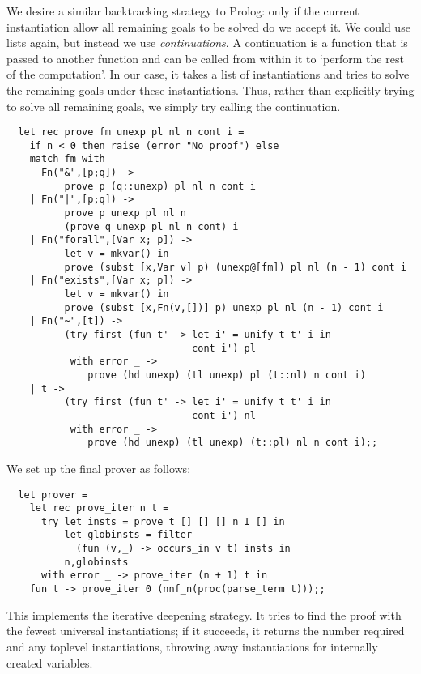 We desire a similar backtracking strategy to Prolog: only if the current
instantiation allow all remaining goals to be solved do we accept it. We could
use lists again, but instead we use {\em continuations}. A continuation is a
function that is passed to another function and can be called from within it to
`perform the rest of the computation'. In our case, it takes a list of
instantiations and tries to solve the remaining goals under these
instantiations. Thus, rather than explicitly trying to solve all remaining
goals, we simply try calling the continuation.

\begin{boxed}\begin{verbatim}
  let rec prove fm unexp pl nl n cont i =
    if n < 0 then raise (error "No proof") else
    match fm with
      Fn("&",[p;q]) ->
          prove p (q::unexp) pl nl n cont i
    | Fn("|",[p;q]) ->
          prove p unexp pl nl n
          (prove q unexp pl nl n cont) i
    | Fn("forall",[Var x; p]) ->
          let v = mkvar() in
          prove (subst [x,Var v] p) (unexp@[fm]) pl nl (n - 1) cont i
    | Fn("exists",[Var x; p]) ->
          let v = mkvar() in
          prove (subst [x,Fn(v,[])] p) unexp pl nl (n - 1) cont i
    | Fn("~",[t]) ->
          (try first (fun t' -> let i' = unify t t' i in
                                cont i') pl
           with error _ ->
              prove (hd unexp) (tl unexp) pl (t::nl) n cont i)
    | t ->
          (try first (fun t' -> let i' = unify t t' i in
                                cont i') nl
           with error _ ->
              prove (hd unexp) (tl unexp) (t::pl) nl n cont i);;
\end{verbatim}\end{boxed}

\noindent We set up the final prover as follows:

\begin{boxed}\begin{verbatim}
  let prover =
    let rec prove_iter n t =
      try let insts = prove t [] [] [] n I [] in
          let globinsts = filter
            (fun (v,_) -> occurs_in v t) insts in
          n,globinsts
      with error _ -> prove_iter (n + 1) t in
    fun t -> prove_iter 0 (nnf_n(proc(parse_term t)));;
\end{verbatim}\end{boxed}

This implements the iterative deepening strategy. It tries to find the proof
with the fewest universal instantiations; if it succeeds, it returns the number
required and any toplevel instantiations, throwing away instantiations for
internally created variables.

